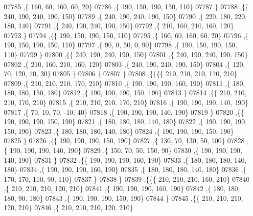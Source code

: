 \begin{DoxyCode}
07785     ,\{   160,    60,   160,    60,    20\}
07786     ,\{   190,   150,   190,   150,   110\}
07787     \}
07788    ,\{\{   240,   190,   240,   190,   150\}
07789     ,\{   240,   190,   240,   190,   150\}
07790     ,\{   220,   180,   220,   180,   140\}
07791     ,\{   240,   190,   240,   190,   150\}
07792     ,\{   210,   160,   210,   160,   120\}
07793     \}
07794    ,\{\{   190,   150,   190,   150,   110\}
07795     ,\{   160,    60,   160,    60,    20\}
07796     ,\{   190,   150,   190,   150,   110\}
07797     ,\{    90,     0,    50,     0,    90\}
07798     ,\{   190,   150,   190,   150,   110\}
07799     \}
07800    ,\{\{   240,   190,   240,   190,   150\}
07801     ,\{   240,   190,   240,   190,   150\}
07802     ,\{   210,   160,   210,   160,   120\}
07803     ,\{   240,   190,   240,   190,   150\}
07804     ,\{   120,    70,   120,    70,    30\}
07805     \}
07806    \}
07807   \}
07808  ,\{\{\{\{   210,   210,   210,   170,   210\}
07809     ,\{   210,   210,   210,   170,   210\}
07810     ,\{   190,   190,   190,   160,   190\}
07811     ,\{   180,   180,   180,   150,   180\}
07812     ,\{   190,   190,   190,   150,   190\}
07813     \}
07814    ,\{\{   210,   210,   210,   170,   210\}
07815     ,\{   210,   210,   210,   170,   210\}
07816     ,\{   190,   190,   190,   140,   190\}
07817     ,\{    70,    10,    70,   -10,    40\}
07818     ,\{   190,   190,   190,   140,   190\}
07819     \}
07820    ,\{\{   190,   190,   190,   150,   190\}
07821     ,\{   180,   180,   180,   140,   180\}
07822     ,\{   190,   190,   190,   150,   190\}
07823     ,\{   180,   180,   180,   140,   180\}
07824     ,\{   190,   190,   190,   150,   190\}
07825     \}
07826    ,\{\{   190,   190,   190,   150,   190\}
07827     ,\{   130,    70,   130,    50,   100\}
07828     ,\{   190,   190,   190,   140,   190\}
07829     ,\{   150,    70,    50,   150,    90\}
07830     ,\{   190,   190,   190,   140,   190\}
07831     \}
07832    ,\{\{   190,   190,   190,   160,   190\}
07833     ,\{   180,   180,   180,   140,   180\}
07834     ,\{   190,   190,   190,   160,   190\}
07835     ,\{   180,   180,   180,   140,   180\}
07836     ,\{   170,   170,   110,    90,   110\}
07837     \}
07838    \}
07839   ,\{\{\{   210,   210,   210,   160,   210\}
07840     ,\{   210,   210,   210,   120,   210\}
07841     ,\{   190,   190,   190,   160,   190\}
07842     ,\{   180,   180,   180,    90,   180\}
07843     ,\{   190,   190,   190,   150,   190\}
07844     \}
07845    ,\{\{   210,   210,   210,   120,   210\}
07846     ,\{   210,   210,   210,   120,   210\}

\end{DoxyCode}
